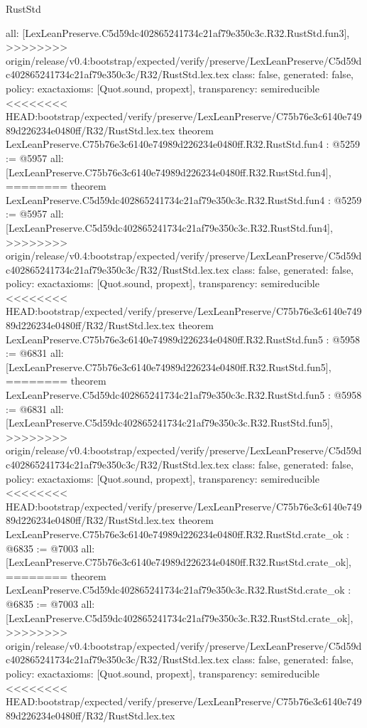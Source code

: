 \begin{lexlean}{RustStd}
\begin{coremodule}
{\begin{coremodule}
{{{{{{{  all: [LexLeanPreserve.C5d59dc402865241734c21af79e350c3c.R32.RustStd.fun3],
>>>>>>>> origin/release/v0.4:bootstrap/expected/verify/preserve/LexLeanPreserve/C5d59dc402865241734c21af79e350c3c/R32/RustStd.lex.tex
  class: false,
  generated: false,
  policy: exact{axioms: [Quot.sound, propext]},
  transparency: semireducible
}
<<<<<<<< HEAD:bootstrap/expected/verify/preserve/LexLeanPreserve/C75b76e3c6140e74989d226234e0480ff/R32/RustStd.lex.tex
theorem LexLeanPreserve.C75b76e3c6140e74989d226234e0480ff.R32.RustStd.fun4 : @5259 := @5957 {
  all: [LexLeanPreserve.C75b76e3c6140e74989d226234e0480ff.R32.RustStd.fun4],
========
theorem LexLeanPreserve.C5d59dc402865241734c21af79e350c3c.R32.RustStd.fun4 : @5259 := @5957 {
  all: [LexLeanPreserve.C5d59dc402865241734c21af79e350c3c.R32.RustStd.fun4],
>>>>>>>> origin/release/v0.4:bootstrap/expected/verify/preserve/LexLeanPreserve/C5d59dc402865241734c21af79e350c3c/R32/RustStd.lex.tex
  class: false,
  generated: false,
  policy: exact{axioms: [Quot.sound, propext]},
  transparency: semireducible
}
<<<<<<<< HEAD:bootstrap/expected/verify/preserve/LexLeanPreserve/C75b76e3c6140e74989d226234e0480ff/R32/RustStd.lex.tex
theorem LexLeanPreserve.C75b76e3c6140e74989d226234e0480ff.R32.RustStd.fun5 : @5958 := @6831 {
  all: [LexLeanPreserve.C75b76e3c6140e74989d226234e0480ff.R32.RustStd.fun5],
========
theorem LexLeanPreserve.C5d59dc402865241734c21af79e350c3c.R32.RustStd.fun5 : @5958 := @6831 {
  all: [LexLeanPreserve.C5d59dc402865241734c21af79e350c3c.R32.RustStd.fun5],
>>>>>>>> origin/release/v0.4:bootstrap/expected/verify/preserve/LexLeanPreserve/C5d59dc402865241734c21af79e350c3c/R32/RustStd.lex.tex
  class: false,
  generated: false,
  policy: exact{axioms: [Quot.sound, propext]},
  transparency: semireducible
}
<<<<<<<< HEAD:bootstrap/expected/verify/preserve/LexLeanPreserve/C75b76e3c6140e74989d226234e0480ff/R32/RustStd.lex.tex
theorem LexLeanPreserve.C75b76e3c6140e74989d226234e0480ff.R32.RustStd.crate_ok : @6835 := @7003 {
  all: [LexLeanPreserve.C75b76e3c6140e74989d226234e0480ff.R32.RustStd.crate_ok],
========
theorem LexLeanPreserve.C5d59dc402865241734c21af79e350c3c.R32.RustStd.crate_ok : @6835 := @7003 {
  all: [LexLeanPreserve.C5d59dc402865241734c21af79e350c3c.R32.RustStd.crate_ok],
>>>>>>>> origin/release/v0.4:bootstrap/expected/verify/preserve/LexLeanPreserve/C5d59dc402865241734c21af79e350c3c/R32/RustStd.lex.tex
  class: false,
  generated: false,
  policy: exact{axioms: [Quot.sound, propext]},
  transparency: semireducible
}
<<<<<<<< HEAD:bootstrap/expected/verify/preserve/LexLeanPreserve/C75b76e3c6140e74989d226234e0480ff/R32/RustStd.lex.tex
}}}}}}}}}
\end{coremodule}}
\end{coremodule}
\end{lexlean}
